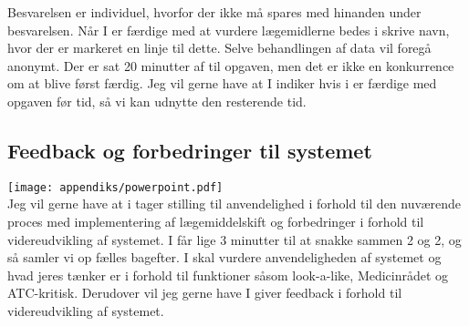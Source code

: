 Besvarelsen er individuel, hvorfor der ikke må spares med hinanden under besvarelsen. Når I er færdige med at vurdere lægemidlerne bedes i skrive navn, hvor der er markeret en linje til dette. Selve behandlingen af data vil foregå anonymt. Der er sat 20 minutter af til opgaven, men det er ikke en konkurrence om at blive først færdig. Jeg vil gerne have at I indiker hvis i er færdige med opgaven før tid, så vi kan udnytte den resterende tid.

\subsection{Feedback og forbedringer til systemet}
\texttt{[image: appendiks/powerpoint.pdf]} \\ 

Jeg vil gerne have at i tager stilling til anvendelighed i forhold til den nuværende proces med implementering af lægemiddelskift og forbedringer i forhold til videreudvikling af systemet. I får lige 3 minutter til at snakke sammen 2 og 2, og så samler vi op fælles bagefter. I skal  vurdere anvendeligheden af systemet og hvad jeres tænker er i forhold til funktioner såsom  look-a-like, Medicinrådet og ATC-kritisk. Derudover vil jeg gerne have I giver feedback i forhold til videreudvikling af systemet.

